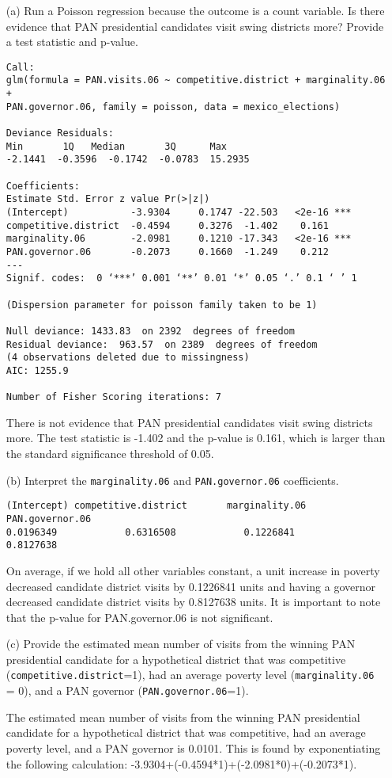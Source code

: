 \documentclass[12pt,letterpaper]{article}
\begin{document}
\begin{enumerate}
	\item [(a)]
	Run a Poisson regression because the outcome is a count variable. Is there evidence that PAN presidential candidates visit swing districts more? Provide a test statistic and p-value.
	\newpage
	
	\begin{Verbatim}
Call:
glm(formula = PAN.visits.06 ~ competitive.district + marginality.06 + 
PAN.governor.06, family = poisson, data = mexico_elections)

Deviance Residuals: 
Min       1Q   Median       3Q      Max  
-2.1441  -0.3596  -0.1742  -0.0783  15.2935  

Coefficients:
Estimate Std. Error z value Pr(>|z|)    
(Intercept)           -3.9304     0.1747 -22.503   <2e-16 ***
competitive.district  -0.4594     0.3276  -1.402    0.161    
marginality.06        -2.0981     0.1210 -17.343   <2e-16 ***
PAN.governor.06       -0.2073     0.1660  -1.249    0.212    
---
Signif. codes:  0 ‘***’ 0.001 ‘**’ 0.01 ‘*’ 0.05 ‘.’ 0.1 ‘ ’ 1

(Dispersion parameter for poisson family taken to be 1)

Null deviance: 1433.83  on 2392  degrees of freedom
Residual deviance:  963.57  on 2389  degrees of freedom
(4 observations deleted due to missingness)
AIC: 1255.9

Number of Fisher Scoring iterations: 7
	\end{Verbatim}
	There is not evidence that PAN presidential candidates visit swing districts more. The test statistic is -1.402 and the p-value is 0.161, which is larger than the standard significance threshold of 0.05.
	\item [(b)]
	Interpret the \texttt{marginality.06} and \texttt{PAN.governor.06} coefficients.
	
	
	\begin{Verbatim}
(Intercept) competitive.district       marginality.06      PAN.governor.06 
0.0196349            0.6316508            0.1226841            0.8127638 
	\end{Verbatim}
	On average, if we hold all other variables constant, a unit increase in poverty decreased candidate district visits by 0.1226841 units and having a governor decreased candidate district visits by 0.8127638 units. It is important to note that the p-value for PAN.governor.06 is not significant.
	\item [(c)]
	Provide the estimated mean number of visits from the winning PAN presidential candidate for a hypothetical district that was competitive (\texttt{competitive.district}=1), had an average poverty level (\texttt{marginality.06} = 0), and a PAN governor (\texttt{PAN.governor.06}=1).
	
	The estimated mean number of visits from the winning PAN presidential candidate for a hypothetical district that was competitive, had an average poverty level, and a PAN governor is 0.0101. This is found by exponentiating the following calculation: -3.9304+(-0.4594*1)+(-2.0981*0)+(-0.2073*1).
\end{enumerate}
	
\end{document}
